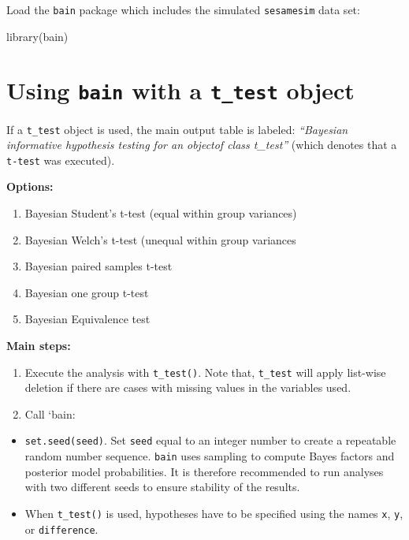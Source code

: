 \documentclass[
]{book}
\newenvironment{Shaded}{\begin{snugshade}}{\end{snugshade}}
\newcommand{\FunctionTok}[1]{\textcolor[rgb]{0.00,0.00,0.00}{#1}}
\newcommand{\NormalTok}[1]{#1}
\providecommand{\tightlist}{%
  \setlength{\itemsep}{0pt}\setlength{\parskip}{0pt}}
\begin{document}
Load the \texttt{bain} package which includes the simulated \texttt{sesamesim} data set:

\begin{Shaded}
\begin{Highlighting}[]
\FunctionTok{library}\NormalTok{(bain)}
\end{Highlighting}
\end{Shaded}

\hypertarget{using-bain-with-a-t_test-object}{%
\section{\texorpdfstring{Using \texttt{bain} with a \texttt{t\_test} object}{Using bain with a t\_test object}}\label{using-bain-with-a-t_test-object}}

If a \texttt{t\_test} object is used, the main output table is
labeled: \emph{``Bayesian informative hypothesis testing for an objectof class t\_test''} (which denotes that a \texttt{t-test} was executed).

\textbf{Options:}

\begin{enumerate}
\def\labelenumi{\alph{enumi})}
\tightlist
\item
  Bayesian Student's t-test (equal within group variances)
\item
  Bayesian Welch's t-test (unequal within group variances
\item
  Bayesian paired samples t-test
\item
  Bayesian one group t-test
\item
  Bayesian Equivalence test
\end{enumerate}

\textbf{Main steps:}

\begin{enumerate}
\def\labelenumi{\arabic{enumi})}
\item
  Execute the analysis with \texttt{t\_test()}. Note that, \texttt{t\_test} will apply list-wise deletion if there are cases with missing values in the variables used.
\item
  Call `bain:
\end{enumerate}

\begin{itemize}
\item
  \texttt{set.seed(seed)}. Set \texttt{seed} equal to an integer number to create a repeatable random number sequence. \texttt{bain} uses sampling to compute Bayes factors and posterior model probabilities. It is therefore recommended to run analyses with two different seeds to ensure stability of the results.
\item
  When \texttt{t\_test()} is used, hypotheses have to be specified using the names \texttt{x}, \texttt{y}, or \texttt{difference}.
\end{itemize}
\end{document}
